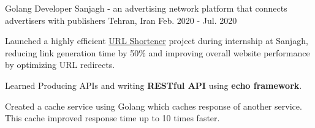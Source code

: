 \begin{cventries}
  \cventry
    {Golang Developer} %
    { Sanjagh - \textnormal{an advertising network platform that connects advertisers with publishers}} %
    {Tehran, Iran} %
    {Feb. 2020 - Jul. 2020} %
    {
      \begin{cvitems} %
        \item Launched a highly efficient \href{https://github.com/pooria1/url-shortener}{URL Shortener} project during internship at Sanjagh, reducing link generation time by 50\% and improving overall website performance by optimizing URL redirects.
        \item Learned Producing APIs and writing \textbf{RESTful API} using \textbf{echo framework}.
        \item Created a cache service using Golang which caches response of another service. This cache improved response time up to 10 times faster.
      \end{cvitems}
    }

\end{cventries}
